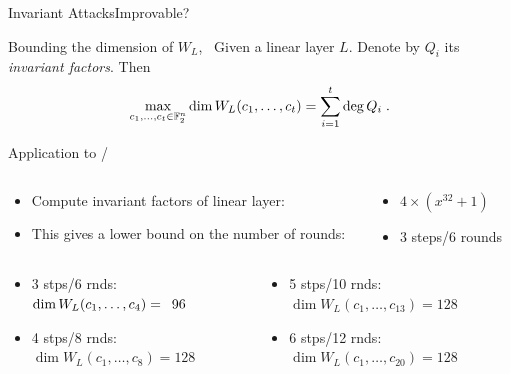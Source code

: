 \begin{frame}{Invariant Attacks}{Improvable?}
    \begin{block}{Bounding the dimension of $W_L$,~\cite[Theorem~1]{C:BCLR17}}
        Given a linear layer $L$.
        Denote by $Q_i$ its \emph{invariant factors}.
        Then
        \begin{equation*}
            \max_{c_1, \dots, c_t \in \mathbb{F}_2^n} \dim W_L(c_1, \dots, c_t) = \sum_{i=1}^t \deg Q_i\;.
        \end{equation*}
    \end{block}
    \pause
    \begin{block}{Application to \clyde/}
    \begin{columns}
        \begin{column}{0.6\textwidth}
        \begin{itemize}
            \item Compute invariant factors of linear layer:
            \item This gives a lower bound on the number of rounds:
        \end{itemize}
        \end{column}
        \pause
        \begin{column}{0.35\textwidth}
        \begin{itemize}
            \item[] $4 \times (x^{32}+1)$
            \item[] 3 steps/6 rounds
        \end{itemize}
        \end{column}
    \end{columns}
    \pause
    \begin{columns}
        \begin{column}{0.475\textwidth}
            \begin{itemize}
                \item 3 stps/6 rnds: $\dim W_L(c_1,\dots,c_4) = \hphantom{1}96$
                \item 4 stps/8 rnds: $\dim W_L(c_1,\dots,c_8) = 128$
            \end{itemize}
        \end{column}
        \begin{column}{0.475\textwidth}
            \begin{itemize}
                \item 5 stps/10 rnds: $\dim W_L(c_1,\dots,c_{13}) = 128$
                \item 6 stps/12 rnds: $\dim W_L(c_1,\dots,c_{20}) = 128$
            \end{itemize}
        \end{column}
    \end{columns}
    \end{block}
\end{frame}

